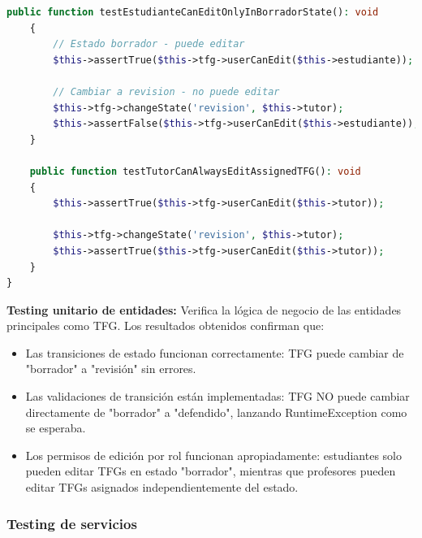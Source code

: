 \documentclass[12pt,a4paper,oneside]{report}
\begin{document}
\begin{lstlisting}[language=PHP]
    public function testEstudianteCanEditOnlyInBorradorState(): void
    {
        // Estado borrador - puede editar
        $this->assertTrue($this->tfg->userCanEdit($this->estudiante));
        
        // Cambiar a revision - no puede editar
        $this->tfg->changeState('revision', $this->tutor);
        $this->assertFalse($this->tfg->userCanEdit($this->estudiante));
    }

    public function testTutorCanAlwaysEditAssignedTFG(): void
    {
        $this->assertTrue($this->tfg->userCanEdit($this->tutor));
        
        $this->tfg->changeState('revision', $this->tutor);
        $this->assertTrue($this->tfg->userCanEdit($this->tutor));
    }
}
\end{lstlisting}

\textbf{Testing unitario de entidades:} Verifica la lógica de negocio de las entidades principales como TFG. Los resultados obtenidos confirman que:
\begin{itemize}
\item Las transiciones de estado funcionan correctamente: TFG puede cambiar de "borrador" a "revisión" sin errores.
\item Las validaciones de transición están implementadas: TFG NO puede cambiar directamente de "borrador" a "defendido", lanzando RuntimeException como se esperaba.
\item Los permisos de edición por rol funcionan apropiadamente: estudiantes solo pueden editar TFGs en estado "borrador", mientras que profesores pueden editar TFGs asignados independientemente del estado.
\end{itemize}

\subsubsection{Testing de servicios}\label{testing-de-servicios}
\end{document}
